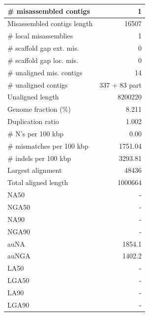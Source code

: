 \documentclass[12pt,a4paper]{article}
\begin{document}
\begin{table}[ht]
\begin{center}
\begin{tabular}{|l*{1}{|r}|}
\# misassembled contigs & 1 \\ \hline
Misassembled contigs length & 16507 \\ \hline
\# local misassemblies & 1 \\ \hline
\# scaffold gap ext. mis. & 0 \\ \hline
\# scaffold gap loc. mis. & 0 \\ \hline
\# unaligned mis. contigs & 14 \\ \hline
\# unaligned contigs & 337 + 83 part \\ \hline
Unaligned length & 8200220 \\ \hline
Genome fraction (\%) & 8.211 \\ \hline
Duplication ratio & 1.002 \\ \hline
\# N's per 100 kbp & 0.00 \\ \hline
\# mismatches per 100 kbp & 1751.04 \\ \hline
\# indels per 100 kbp & 3293.81 \\ \hline
Largest alignment & 48436 \\ \hline
Total aligned length & 1000664 \\ \hline
NA50 & - \\ \hline
NGA50 & - \\ \hline
NA90 & - \\ \hline
NGA90 & - \\ \hline
auNA & 1854.1 \\ \hline
auNGA & 1402.2 \\ \hline
LA50 & - \\ \hline
LGA50 & - \\ \hline
LA90 & - \\ \hline
LGA90 & - \\ \hline
\end{tabular}
\end{center}
\end{table}
\end{document}
